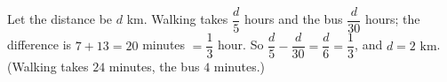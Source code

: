 Let the distance be $d$ km. Walking takes $\dfrac {d}{5}$ hours and the bus $\dfrac {d}{30}$ hours; the difference is $7+13=20$ minutes $=\dfrac{1}{3}$ hour. So $\dfrac {d}{5}-\dfrac {d}{30}=\dfrac {d}{6}=\dfrac{1}{3}$, and $d=\boxed{2\text{ km}}$. (Walking takes $24$ minutes, the bus $4$ minutes.)
